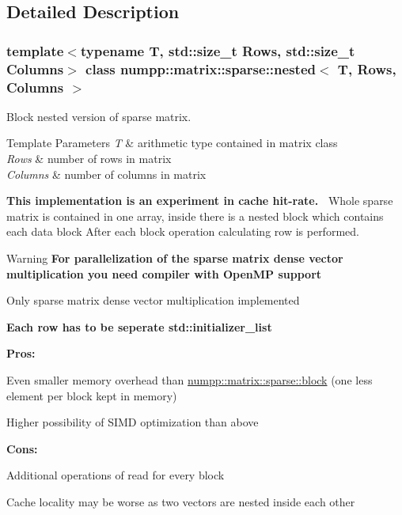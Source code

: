 \subsection{Detailed Description}
\subsubsection*{template$<$typename T, std\+::size\+\_\+t Rows, std\+::size\+\_\+t Columns$>$\newline
class numpp\+::matrix\+::sparse\+::nested$<$ T, Rows, Columns $>$}

Block nested version of sparse matrix. 


\begin{DoxyTemplParams}{Template Parameters}
{\em T} & arithmetic type contained in matrix class \\
\hline
{\em Rows} & number of rows in matrix \\
\hline
{\em Columns} & number of columns in matrix\\
\hline
\end{DoxyTemplParams}
{\bfseries This implementation is an experiment in cache hit-\/rate.~\newline
 } Whole sparse matrix is contained in one array, inside there is a nested block which contains each data block After each block operation calculating row is performed.

\begin{DoxyWarning}{Warning}
{\bfseries For parallelization of the sparse matrix dense vector multiplication you need compiler with Open\+MP support} 

Only sparse matrix dense vector multiplication implemented 

{\bfseries Each row has to be seperate std\+::initializer\+\_\+list}
\end{DoxyWarning}
{\bfseries Pros\+:}
\begin{DoxyItemize}
\item Even smaller memory overhead than \hyperlink{classnumpp_1_1matrix_1_1sparse_1_1block}{numpp\+::matrix\+::sparse\+::block} (one less element per block kept in memory)
\item Higher possibility of S\+I\+MD optimization than above
\end{DoxyItemize}

{\bfseries Cons\+:}
\begin{DoxyItemize}
\item Additional operations of read for every block
\item Cache locality may be worse as two vectors are nested inside each other
\end{DoxyItemize}

